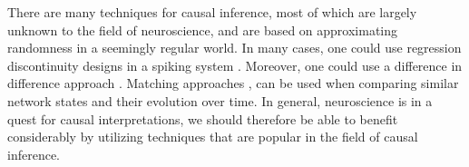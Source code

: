 \documentclass[11pt]{article}
\begin{document}
There are many techniques for causal inference, most of which are largely unknown to the field of neuroscience, and are based on approximating randomness in a seemingly regular world. 
In many cases, one could use regression discontinuity designs in a spiking system \citep{BenPaper, imbens2008regression}. 
Moreover, one could use a difference in difference approach \citep{abadie2005semiparametric}. 
Matching approaches \citep{stuart2010matching, king2016propensity}, can be used when comparing similar network states and their evolution over time. 
In general, neuroscience is in a quest for causal interpretations, we should therefore be able to benefit considerably by utilizing techniques that are popular in the field of causal inference.


\end{document}
